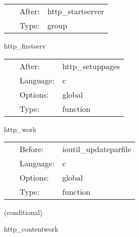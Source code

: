  \begin{tabular*}{160mm}{cll} 
~ & After:  & http\_startserver \\ 
~ & Type:  & group \\ 
\end{tabular*} 


\vspace{5mm}


\hspace{5mm} http\_firstserv 

\hspace{5mm}{\it serve first pages at startup } 


\hspace{5mm}

 \begin{tabular*}{160mm}{cll} 
~ & After:  & http\_setuppages \\ 
~ & Language:  & c \\ 
~ & Options:  & global \\ 
~ & Type:  & function \\ 
\end{tabular*} 


\vspace{5mm}


\hspace{5mm} http\_work 

\hspace{5mm}{\it working routine } 


\hspace{5mm}

 \begin{tabular*}{160mm}{cll} 
~ & Before:  & ioutil\_updateparfile \\ 
~ & Language:  & c \\ 
~ & Options:  & global \\ 
~ & Type:  & function \\ 
\end{tabular*} 


\vspace{5mm}

   (conditional) 

\hspace{5mm} http\_contentwork 

\hspace{5mm}{\it content working routine } 


